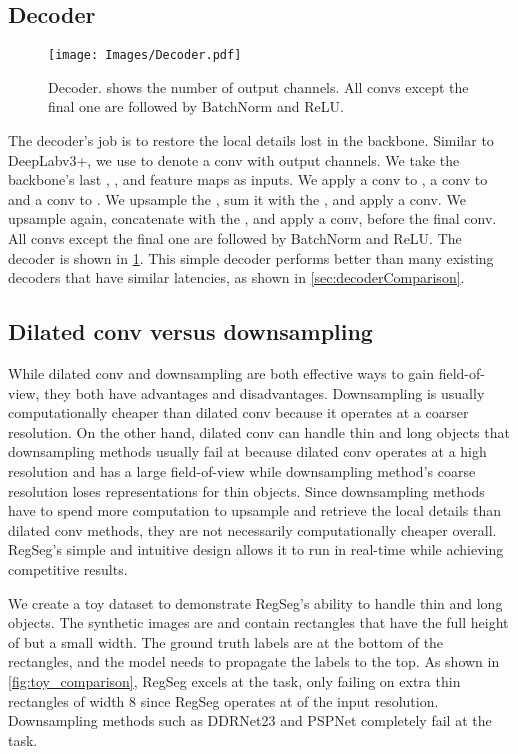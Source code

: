 \documentclass[10pt,twocolumn,letterpaper]{article}
\begin{document}
\subsection{Decoder}
\label{sec:decoder}


\begin{figure}
  \centering
    \texttt{[image: Images/Decoder.pdf]}

   \caption{Decoder.  shows the number of output channels. All convs except the final one are followed by BatchNorm\cite{batchnorm} and ReLU.}
   \label{fig:Decoder}
\end{figure}

The decoder's job is to restore the local details lost in the backbone. Similar to DeepLabv3+\cite{deeplabv3plus2018}, we use  to denote a  conv with  output channels. We take the backbone's last , , and  feature maps as inputs. We apply a  conv to , a  conv to  and a  conv to . We upsample the , sum it with the , and apply a  conv. We upsample again, concatenate with the , and apply a  conv, before the final  conv. All convs except the final one are followed by BatchNorm\cite{batchnorm} and ReLU. The decoder is shown in \cref{fig:Decoder}. This simple decoder performs better than many existing decoders that have similar latencies, as shown in \cref{sec:decoderComparison}.

\subsection{Dilated conv versus downsampling}
While dilated conv and downsampling are both effective ways to gain field-of-view, they both have advantages and disadvantages. Downsampling is usually computationally cheaper than dilated conv because it operates at a coarser resolution. On the other hand, dilated conv can handle thin and long objects that downsampling methods usually fail at because dilated conv operates at a high resolution and has a large field-of-view while downsampling method's coarse resolution loses representations for thin objects. Since downsampling methods have to spend more computation to upsample and retrieve the local details than dilated conv methods, they are not necessarily computationally cheaper overall. RegSeg's simple and intuitive design allows it to run in real-time while achieving competitive results.

We create a toy dataset to demonstrate RegSeg's ability to handle thin and long objects. The synthetic images are  and contain rectangles that have the full height of  but a small width. The ground truth labels are at the bottom of the rectangles, and the model needs to propagate the labels to the top. As shown in \cref{fig:toy_comparison}, RegSeg excels at the task, only failing on extra thin rectangles of width 8 since RegSeg operates at  of the input resolution. Downsampling methods such as DDRNet23\cite{ddrnet} and PSPNet\cite{pspnet} completely fail at the task.
\end{document}
